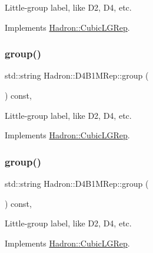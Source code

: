Little-\/group label, like D2, D4, etc. 

Implements \mbox{\hyperlink{structHadron_1_1CubicLGRep_a9bdb14b519a611d21379ed96a3a9eb41}{Hadron\+::\+Cubic\+L\+G\+Rep}}.

\mbox{\label{structHadron_1_1D4B1MRep_ad15b8741fcc6e6c63b0125b283dbbbab}} 
\subsubsection{\texorpdfstring{group()}{group()}\hspace{0.1cm}{\footnotesize\ttfamily [2/3]}}
{\footnotesize\ttfamily std\+::string Hadron\+::\+D4\+B1\+M\+Rep\+::group (\begin{DoxyParamCaption}{ }\end{DoxyParamCaption}) const\hspace{0.3cm}{\ttfamily [inline]}, {\ttfamily [virtual]}}

Little-\/group label, like D2, D4, etc. 

Implements \mbox{\hyperlink{structHadron_1_1CubicLGRep_a9bdb14b519a611d21379ed96a3a9eb41}{Hadron\+::\+Cubic\+L\+G\+Rep}}.

\mbox{\label{structHadron_1_1D4B1MRep_ad15b8741fcc6e6c63b0125b283dbbbab}} 
\subsubsection{\texorpdfstring{group()}{group()}\hspace{0.1cm}{\footnotesize\ttfamily [3/3]}}
{\footnotesize\ttfamily std\+::string Hadron\+::\+D4\+B1\+M\+Rep\+::group (\begin{DoxyParamCaption}{ }\end{DoxyParamCaption}) const\hspace{0.3cm}{\ttfamily [inline]}, {\ttfamily [virtual]}}

Little-\/group label, like D2, D4, etc. 

Implements \mbox{\hyperlink{structHadron_1_1CubicLGRep_a9bdb14b519a611d21379ed96a3a9eb41}{Hadron\+::\+Cubic\+L\+G\+Rep}}.

\mbox{\label{structHadron_1_1D4B1MRep_a8bcd49be46064fc4ee93c98a36a3da8d}} 
